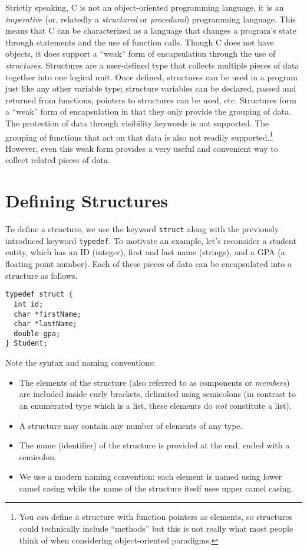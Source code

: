 

Strictly speaking, C is not an object-oriented programming language, 
it is an \emph{imperative} (or, relatedly a \emph{structured} or 
\emph{procedural}) programming language.  This means that C can be 
characterized as a language that changes a program's state through statements
and the use of function calls.  Though C does not have objects, it
does support a ``weak'' form of encapsulation through the use
of \emph{structures}.  Structures are a user-defined type that 
collects multiple pieces of data together into one logical unit.
Once defined, structures can be used in a program just like any
other variable type; structure variables can be declared, passed and returned
from functions, pointers to structures can be used, etc.
Structures form a ``weak'' form of encapsulation in that they only
provide the grouping of data.  The protection of data through 
visibility keywords is not supported.  The grouping of functions
that act on that data is also not readily supported.\footnote{You
\emph{can} define a structure with function pointers as elements, 
so structures could technically include ``methods'' but this is
not really what most people think of when considering object-oriented
paradigms.}  However, even this weak form provides a very useful
and convenient way to collect related pieces of data.

\section{Defining Structures}

To define a structure, we use the keyword \texttt{struct}
along with the previously introduced keyword \texttt{typedef}.
To motivate an example, let's reconsider a student entity, which
has an ID (integer), first and last name (strings), and a GPA 
(a floating point number).  Each of these pieces of data can be
encapsulated into a structure as follows.

\begin{verbatim}
typedef struct {
  int id;
  char *firstName;
  char *lastName;
  double gpa;
} Student;
\end{verbatim}

Note the syntax and naming conventions:
\begin{itemize}
  \item The elements of the structure (also referred to as components 
    or \emph{members}) are included inside curly brackets, 
  	delimited using semicolons (in contrast to an enumerated type which 
	is a list, these elements do \emph{not} constitute a list).
  \item A structure may contain any number of elements of any type.
  \item The name (identifier) of the structure is provided at the end, ended with
  	a semicolon.
  \item We use a modern naming convention: each element is named
  	using lower camel casing while the name of the structure itself
	uses upper camel casing.
\end{itemize}

